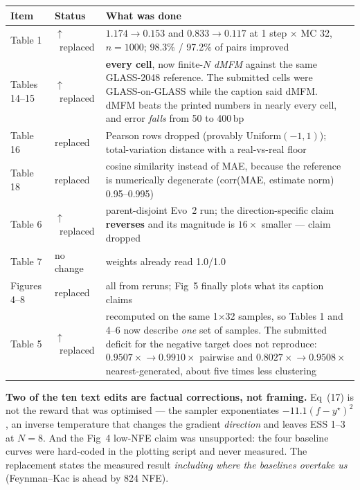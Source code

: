 \documentclass[10pt]{article}
\newcommand{\up}{\textcolor{ok}{$\uparrow$}}
\begin{document}
\begin{center}
\begin{tabular}{@{}llp{7.6cm}@{}}
\toprule
\textbf{Item} & \textbf{Status} & \textbf{What was done} \\
\midrule
Table 1 & \up\ replaced & $1.174\!\to\!0.153$ and $0.833\!\to\!0.117$ at 1 step $\times$ MC 32,
  $n{=}1000$; 98.3\% / 97.2\% of pairs improved \\
Tables 14--15 & \up\ replaced & \textbf{every cell}, now finite-$N$ \emph{dMFM} against the same
  GLASS-2048 reference. The submitted cells were GLASS-on-GLASS while the caption said dMFM. dMFM
  beats the printed numbers in nearly every cell, and error \emph{falls} from 50 to 400\,bp \\
Table 16 & replaced & Pearson rows dropped (provably Uniform$(-1,1)$); total-variation distance
  with a real-vs-real floor \\
Table 18 & replaced & cosine similarity instead of MAE, because the reference is numerically
  degenerate (corr(MAE, estimate norm) 0.95--0.995) \\
Table 6 & \up\ replaced & parent-disjoint Evo~2 run; the direction-specific claim
  \textbf{reverses} and its magnitude is $16\times$ smaller --- claim dropped \\
Table 7 & no change & weights already read 1.0/1.0 \\
Figures 4--8 & replaced & all from reruns; Fig~5 finally plots what its caption claims \\
Table 5 & \up\ replaced & recomputed on the same 1$\times$32 samples, so Tables 1 and 4--6 now
  describe \emph{one} set of samples. The submitted deficit for the negative target does not
  reproduce: $0.9507\times\!\to\!0.9910\times$ pairwise and $0.8027\times\!\to\!0.9508\times$
  nearest-generated, about five times less clustering \\
\bottomrule
\end{tabular}
\end{center}

\noindent\textbf{Two of the ten text edits are factual corrections, not framing.} Eq~(17) is not
the reward that was optimised --- the sampler exponentiates $-11.1(f-y^\star)^2$, an inverse
temperature that changes the gradient \emph{direction} and leaves ESS 1--3 at $N{=}8$. And the
Fig~4 low-NFE claim was unsupported: the four baseline curves were hard-coded in the plotting
script and never measured. The replacement states the measured result \emph{including where the
baselines overtake us} (Feynman--Kac is ahead by 824 NFE).
\end{document}
